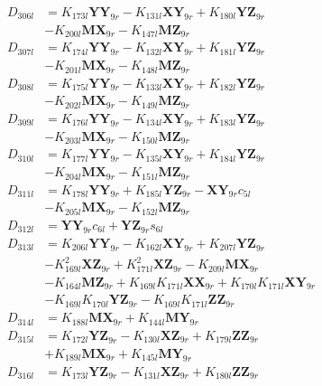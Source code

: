 \begin{multicols}{2}
\begin{align}
D_{306l} &= K_{173l}\mathbf{YY}_{9r} - K_{131l}\mathbf{XY}_{9r} + K_{180l}\mathbf{YZ}_{9r}  \nonumber \\
&- K_{200l}\mathbf{MX}_{9r} - K_{147l}\mathbf{MZ}_{9r} \nonumber \\
D_{307l} &= K_{174l}\mathbf{YY}_{9r} - K_{132l}\mathbf{XY}_{9r} + K_{181l}\mathbf{YZ}_{9r}  \nonumber \\
&- K_{201l}\mathbf{MX}_{9r} - K_{148l}\mathbf{MZ}_{9r} \nonumber \\
D_{308l} &= K_{175l}\mathbf{YY}_{9r} - K_{133l}\mathbf{XY}_{9r} + K_{182l}\mathbf{YZ}_{9r}  \nonumber \\
&- K_{202l}\mathbf{MX}_{9r} - K_{149l}\mathbf{MZ}_{9r} \nonumber \\
D_{309l} &= K_{176l}\mathbf{YY}_{9r} - K_{134l}\mathbf{XY}_{9r} + K_{183l}\mathbf{YZ}_{9r}  \nonumber \\
&- K_{203l}\mathbf{MX}_{9r} - K_{150l}\mathbf{MZ}_{9r} \nonumber \\
D_{310l} &= K_{177l}\mathbf{YY}_{9r} - K_{135l}\mathbf{XY}_{9r} + K_{184l}\mathbf{YZ}_{9r}  \nonumber \\
&- K_{204l}\mathbf{MX}_{9r} - K_{151l}\mathbf{MZ}_{9r} \nonumber \\
D_{311l} &= K_{178l}\mathbf{YY}_{9r} + K_{185l}\mathbf{YZ}_{9r} - \mathbf{XY}_{9r}c_{5l}  \nonumber \\
&- K_{205l}\mathbf{MX}_{9r} - K_{152l}\mathbf{MZ}_{9r} \nonumber \\
D_{312l} &= \mathbf{YY}_{9r}c_{6l} + \mathbf{YZ}_{9r}s_{6l} \nonumber \\
D_{313l} &= K_{206l}\mathbf{YY}_{9r} - K_{162l}\mathbf{XY}_{9r} + K_{207l}\mathbf{YZ}_{9r}  \nonumber \\
&- K_{169l}^2\mathbf{XZ}_{9r} + K_{171l}^2\mathbf{XZ}_{9r} - K_{209l}\mathbf{MX}_{9r}  \nonumber \\
&- K_{164l}\mathbf{MZ}_{9r} + K_{169l}K_{171l}\mathbf{XX}_{9r} + K_{170l}K_{171l}\mathbf{XY}_{9r}  \nonumber \\
&- K_{169l}K_{170l}\mathbf{YZ}_{9r} - K_{169l}K_{171l}\mathbf{ZZ}_{9r} \nonumber \\
D_{314l} &= K_{188l}\mathbf{MX}_{9r} + K_{144l}\mathbf{MY}_{9r} \nonumber \\
D_{315l} &= K_{172l}\mathbf{YZ}_{9r} - K_{130l}\mathbf{XZ}_{9r} + K_{179l}\mathbf{ZZ}_{9r}  \nonumber \\
&+ K_{189l}\mathbf{MX}_{9r} + K_{145l}\mathbf{MY}_{9r} \nonumber \\
D_{316l} &= K_{173l}\mathbf{YZ}_{9r} - K_{131l}\mathbf{XZ}_{9r} + K_{180l}\mathbf{ZZ}_{9r}  \nonumber \\

\end{align}
\end{multicols}

